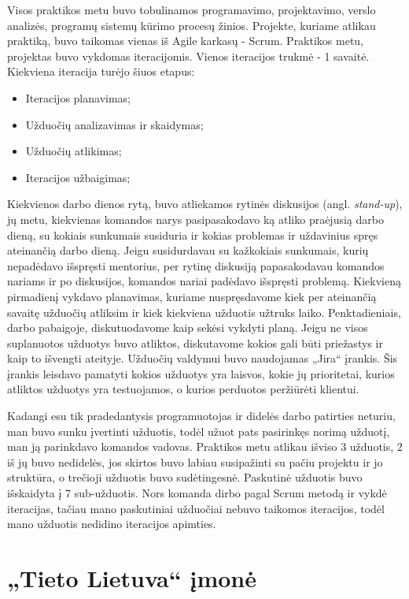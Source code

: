 \documentclass{VUMIFPSbakalaurinis}
\begin{document}
Visos praktikos metu buvo tobulinamos programavimo, projektavimo, verslo analizės, programų sistemų kūrimo procesų žinios. Projekte, kuriame atlikau praktiką, buvo taikomas vienas iš Agile karkasų - Scrum. Praktikos metu, projektas buvo vykdomas iteracijomis. Vienos iteracijos trukmė - 1 savaitė. Kiekviena iteracija turėjo šiuos etapus:
\begin{itemize}
    \item Iteracijos planavimas;
    \item Užduočių analizavimas ir skaidymas;
    \item Užduočių atlikimas;
    \item Iteracijos užbaigimas;
\end{itemize}
Kiekvienos darbo dienos rytą, buvo atliekamos rytinės diskusijos (angl. \textit{stand-up}), jų metu, kiekvienas komandos narys pasipasakodavo ką atliko praėjusią darbo dieną, su kokiais sunkumais susiduria ir kokias problemas ir uždavinius spręs ateinančią darbo dieną. Jeigu susidurdavau su kažkokiais sunkumais, kurių nepadėdavo išspręsti mentorius, per rytinę diskusiją papasakodavau komandos nariams ir po diskusijos, komandos nariai padėdavo išspręsti problemą. Kiekvieną pirmadienį vykdavo planavimas, kuriame nuspręsdavome kiek per ateinančią savaitę užduočių atliksim ir kiek kiekviena užduotis užtruks laiko. Penktadieniais, darbo pabaigoje, diskutuodavome kaip sekėsi vykdyti planą. Jeigu ne visos suplanuotos užduotys buvo atliktos, diskutavome kokios gali būti priežastys ir kaip to išvengti ateityje. Užduočių valdymui buvo naudojamas „Jira“ įrankis. Šis įrankis leisdavo pamatyti kokios užduotys yra laisvos, kokie jų prioritetai, kurios atliktos užduotys yra testuojamos, o kurios perduotos peržiūrėti klientui.


Kadangi esu tik pradedantysis programuotojas ir didelės darbo patirties neturiu, man buvo sunku įvertinti užduotis, todėl užuot pats pasirinkęs norimą užduotį, man ją parinkdavo komandos vadovas. Praktikos metu atlikau išviso 3 užduotis, 2 iš jų buvo nedidelės, jos skirtos buvo labiau susipažinti su pačiu projektu ir jo struktūra, o trečioji užduotis buvo sudėtingesnė. Paskutinė užduotis buvo išskaidyta į 7 sub-užduotis. Nors komanda dirbo pagal Scrum metodą ir vykdė iteracijas, tačiau mano paskutiniai užduočiai nebuvo taikomos iteracijos, todėl mano užduotis nedidino iteracijos apimties.

\section{„Tieto Lietuva“ įmonė}
\end{document}
